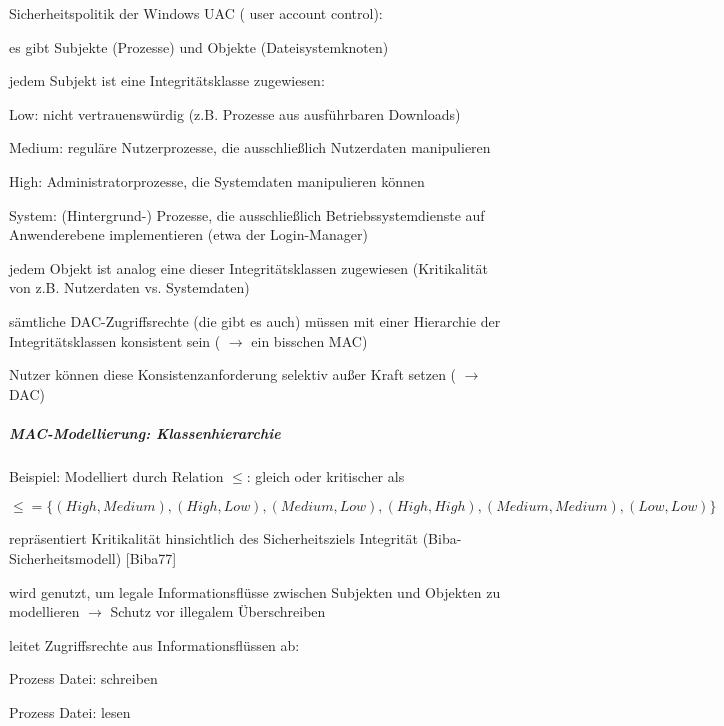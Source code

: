 \documentclass[a4paper]{article}
\begin{document}
\begin{multicols}{3}
    Sicherheitspolitik der Windows UAC ( user account control):

    \begin{itemize*}
        \item
        es gibt Subjekte (Prozesse) und Objekte (Dateisystemknoten)
        \item
        jedem Subjekt ist eine Integritätsklasse zugewiesen:
        \begin{itemize*}
            \item Low: nicht vertrauenswürdig (z.B. Prozesse aus ausführbaren Downloads)
            \item Medium: reguläre Nutzerprozesse, die ausschließlich Nutzerdaten manipulieren
            \item High: Administratorprozesse, die Systemdaten manipulieren können
            \item System: (Hintergrund-) Prozesse, die ausschließlich Betriebssystemdienste auf Anwenderebene implementieren (etwa der Login-Manager)
        \end{itemize*}
        \item
        jedem Objekt ist analog eine dieser Integritätsklassen zugewiesen
        (Kritikalität von z.B. Nutzerdaten vs. Systemdaten)
        \item
        sämtliche DAC-Zugriffsrechte (die gibt es auch) müssen mit einer
        Hierarchie der Integritätsklassen konsistent sein
        ( $\rightarrow$ ein bisschen MAC)
        \item
        Nutzer können diese Konsistenzanforderung selektiv außer Kraft setzen
        ( $\rightarrow$ DAC)
    \end{itemize*}


    \subparagraph{MAC-Modellierung:
        Klassenhierarchie}

    Beispiel: Modelliert durch Relation $\leq$: gleich oder
    kritischer als

    $\leq=\{( High , Medium ), ( High , Low ), ( Medium , Low
        ), ( High , High ), ( Medium , Medium ), ( Low , Low )\}$

    \begin{itemize*}
        \item
        repräsentiert Kritikalität hinsichtlich des Sicherheitsziels
        Integrität (Biba-Sicherheitsmodell) [Biba77]
        \item
        wird genutzt, um legale Informationsflüsse zwischen Subjekten und
        Objekten zu modellieren $\rightarrow$ Schutz vor
        illegalem Überschreiben
        \item
        leitet Zugriffsrechte aus Informationsflüssen ab:
        \begin{itemize*}
            \item Prozess Datei: schreiben
            \item Prozess Datei: lesen
        \end{itemize*}
    \end{itemize*}



\end{multicols}
\end{document}
